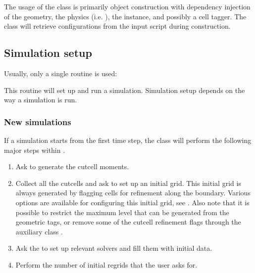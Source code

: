 \documentclass[letterpaper,10pt,english]{sphinxmanual}
\begin{document}
The usage of the  class is primarily object construction with dependency injection of the geometry, the physics (i.e. ), the  instance, and possibly a cell tagger.
The  class will retrieve configurations from the input script during construction.


\subsection{Simulation setup}
\label{\detokenize{Source/Driver:simulation-setup}}
Usually, only a single routine is used:

\begin{sphinxVerbatim}[commandchars=\\\{\},formatcom=\scriptsize]
   
\end{sphinxVerbatim}

This routine will set up and run a simulation.
Simulation setup depends on the way a simulation is run.


\subsubsection{New simulations}
\label{\detokenize{Source/Driver:new-simulations}}
If a simulation starts from the first time step, the  class will perform the following major steps within .
\begin{enumerate}
%
\item {} 
Ask  to generate the cut\sphinxhyphen{}cell moments.

\item {} 
Collect all the cut\sphinxhyphen{}cells and ask  to set up an initial grid.
This initial grid is always generated by flagging cells for refinement along the boundary.
Various options are available for configuring this initial grid, see {\hyperref[\detokenize{Source/SpatialDiscretization:chap-refinementphilosophy}]{}}.
Also note that it is possible to restrict the maximum level that can be generated from the geometric tags, or remove some of the cut\sphinxhyphen{}cell refinement flags through the auxiliary class .

\item {} 
Ask the  to set up relevant solvers and fill them with initial data.

\item {} 
Perform the number of initial regrids that the user asks for.

\end{enumerate}
\end{document}
